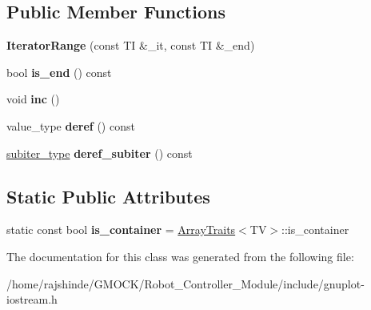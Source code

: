 \subsection*{Public Member Functions}
\begin{DoxyCompactItemize}
\item 
{\bfseries Iterator\+Range} (const TI \&\+\_\+it, const TI \&\+\_\+end)\hypertarget{classgnuplotio_1_1_iterator_range_adb89135fc292dfc5152120bc7fe6135e}{}\label{classgnuplotio_1_1_iterator_range_adb89135fc292dfc5152120bc7fe6135e}

\item 
bool {\bfseries is\+\_\+end} () const \hypertarget{classgnuplotio_1_1_iterator_range_a9146c3be94e09b6318cb0590b5816d1e}{}\label{classgnuplotio_1_1_iterator_range_a9146c3be94e09b6318cb0590b5816d1e}

\item 
void {\bfseries inc} ()\hypertarget{classgnuplotio_1_1_iterator_range_a369f392a561011f8f1c93d13fd976878}{}\label{classgnuplotio_1_1_iterator_range_a369f392a561011f8f1c93d13fd976878}

\item 
value\+\_\+type {\bfseries deref} () const \hypertarget{classgnuplotio_1_1_iterator_range_a58c90f44319ecc5efe43b80892d3b7f2}{}\label{classgnuplotio_1_1_iterator_range_a58c90f44319ecc5efe43b80892d3b7f2}

\item 
\hyperlink{structgnuplotio_1_1_error___was_not_container}{subiter\+\_\+type} {\bfseries deref\+\_\+subiter} () const \hypertarget{classgnuplotio_1_1_iterator_range_a03ee1f4e4e321d6c9676b632dcfc5969}{}\label{classgnuplotio_1_1_iterator_range_a03ee1f4e4e321d6c9676b632dcfc5969}

\end{DoxyCompactItemize}
\subsection*{Static Public Attributes}
\begin{DoxyCompactItemize}
\item 
static const bool {\bfseries is\+\_\+container} = \hyperlink{classgnuplotio_1_1_array_traits}{Array\+Traits}$<$TV$>$\+::is\+\_\+container\hypertarget{classgnuplotio_1_1_iterator_range_a3f79d84bdf18761b6e49ae54d050f8ff}{}\label{classgnuplotio_1_1_iterator_range_a3f79d84bdf18761b6e49ae54d050f8ff}

\end{DoxyCompactItemize}


The documentation for this class was generated from the following file\+:\begin{DoxyCompactItemize}
\item 
/home/rajshinde/\+G\+M\+O\+C\+K/\+Robot\+\_\+\+Controller\+\_\+\+Module/include/gnuplot-\/iostream.\+h\end{DoxyCompactItemize}
